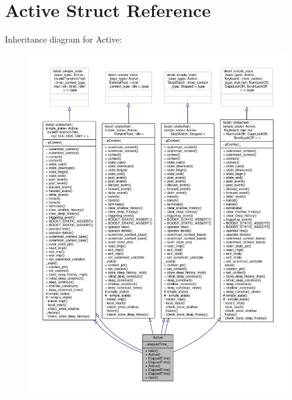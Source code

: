 \hypertarget{struct_active}{}\section{Active Struct Reference}
\label{struct_active}


Inheritance diagram for Active\+:
\nopagebreak
\begin{figure}[H]
\begin{center}
\leavevmode
\includegraphics[width=350pt]{struct_active__inherit__graph}
\end{center}
\end{figure}


